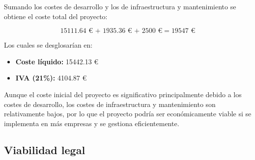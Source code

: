 Sumando los costes de desarrollo y los de infraestructura y mantenimiento se obtiene el coste total del proyecto:

\[\num{15111,64} \text{ € + } \num{1935,36} \text{ € + } \num{2500} \text{ €} = \num{19547} \text{ €}\]

Los cuales se desglosarían en:

\begin{itemize}
	\item \textbf{Coste líquido:} \num{15442,13} €
	\item \textbf{IVA (21\%):} \num{4104,87} €
\end{itemize}

Aunque el coste inicial del proyecto es significativo principalmente debido a los costes de desarrollo, los costes de infraestructura y mantenimiento son relativamente bajos, por lo que el proyecto podría ser económicamente viable si se implementa en más empresas y se gestiona eficientemente.

\subsection{Viabilidad legal}